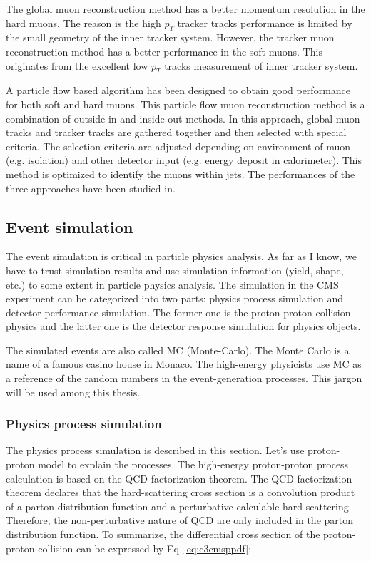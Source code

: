 The global muon reconstruction method has a better momentum resolution in the hard muons. The reason is the high $p_{T}$ tracker tracks performance is limited by the small geometry of the inner tracker system. However, the tracker muon reconstruction method has a better performance in the soft muons. This originates from the excellent low $p_{T}$ tracks measurement of inner tracker system. 

A particle flow based algorithm has been designed to obtain good performance for both soft and hard muons. This particle flow muon reconstruction method is a combination of outside-in and inside-out methods. In this approach, global muon tracks and tracker tracks are gathered together and then selected with special criteria. The selection criteria are adjusted depending on environment of muon (e.g. isolation) and other detector input (e.g. energy deposit in calorimeter). This method is optimized to identify the muons within jets. The performances of the three approaches have been studied in\cite{Chatrchyan:2012xi}. 

\clearpage
\subsection{Event simulation}
The event simulation is critical in particle physics analysis. As far as I know, we have to trust simulation results and use simulation information (yield, shape, etc.) to some extent in particle physics analysis. The simulation in the CMS experiment can be categorized into two parts: physics process simulation and detector performance simulation. The former one is the proton-proton collision physics and the latter one is the detector response simulation for physics objects. 

The simulated events are also called MC (Monte-Carlo). The Monte Carlo is a name of a famous casino house in Monaco. The high-energy physicists use MC as a reference of the random numbers in the event-generation processes. This jargon will be used among this thesis. 

\subsubsection{Physics process simulation}

The physics process simulation is described in this section. Let’s use proton-proton model to explain the processes. The high-energy proton-proton process calculation is based on the QCD factorization theorem\cite{Collins:1989gx}. The QCD factorization theorem declares that the hard-scattering cross section is a convolution product of a parton distribution function and a perturbative calculable hard scattering. Therefore, the non-perturbative nature of QCD are only included in the parton distribution function. To summarize, the differential cross section of the proton-proton collision can be expressed by Eq~\ref{eq:c3cmsppdf}:

